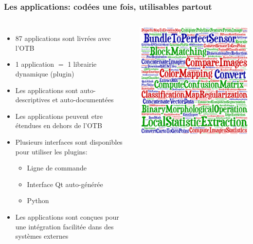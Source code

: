 \documentclass[8pt]{beamer}
\begin{document}
\begin{frame}
\frametitle{Les applications: codées une fois, utilisables partout}
\begin{columns}
\begin{itemize}
\item 87 applications sont livrées avec l'OTB
\item 1 application $=$ 1 librairie dynamique (plugin)
\item Les applications sont auto-descriptives et auto-documentées
\item Les applications peuvent etre étendues en dehors de l'OTB
\item Plusieurs interfaces sont disponibles pour utiliser les plugins:
\begin{itemize}
  \item Ligne de commande
  \item Interface Qt auto-générée
  \item Python
\end{itemize}
\item Les applications sont conçues pour une intégration facilitée dans des systèmes externes
\end{itemize}
\includegraphics[width=\textwidth]{images/cloud_applications.png}
\end{columns}
\end{frame}
\end{document}
